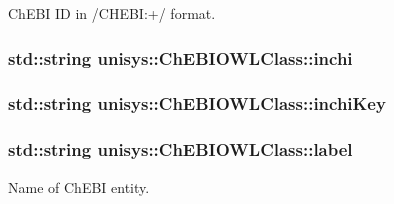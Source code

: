 Ch\-E\-B\-I I\-D in /\-C\-H\-E\-B\-I\-:+/ format. 

\hypertarget{classunisys_1_1ChEBIOWLClass_a46b2c202643987ce0d4e3a105e117822}{
\subsubsection[{inchi}]{\setlength{\rightskip}{0pt plus 5cm}std\-::string unisys\-::\-Ch\-E\-B\-I\-O\-W\-L\-Class\-::inchi\hspace{0.3cm}{\ttfamily [private]}}}\label{classunisys_1_1ChEBIOWLClass_a46b2c202643987ce0d4e3a105e117822}
\hypertarget{classunisys_1_1ChEBIOWLClass_af64b976dc7f141a4935898fcb470cefb}{
\subsubsection[{inchi\-Key}]{\setlength{\rightskip}{0pt plus 5cm}std\-::string unisys\-::\-Ch\-E\-B\-I\-O\-W\-L\-Class\-::inchi\-Key\hspace{0.3cm}{\ttfamily [private]}}}\label{classunisys_1_1ChEBIOWLClass_af64b976dc7f141a4935898fcb470cefb}
\hypertarget{classunisys_1_1ChEBIOWLClass_a5069859deb537ea460525e98d277397c}{
\subsubsection[{label}]{\setlength{\rightskip}{0pt plus 5cm}std\-::string unisys\-::\-Ch\-E\-B\-I\-O\-W\-L\-Class\-::label\hspace{0.3cm}{\ttfamily [private]}}}\label{classunisys_1_1ChEBIOWLClass_a5069859deb537ea460525e98d277397c}


Name of Ch\-E\-B\-I entity. 


